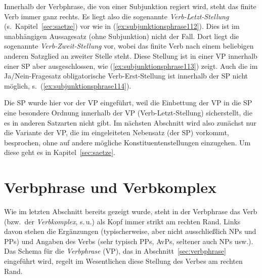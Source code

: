 
Innerhalb der Verbphrase, die von einer Subjunktion regiert wird, steht das finite Verb immer ganz rechts.
Es liegt also die sogenannte \textit{Verb-Letzt-Stellung} (s.\ Kapitel~\ref{sec:saetze}) vor wie in (\ref{ex:subjunktionsphrase112}).
Dies ist im unabhängigen Aussagesatz (ohne Subjunktion) nicht der Fall.
Dort liegt die sogenannte \textit{Verb-Zweit-Stellung} vor, wobei das finite Verb nach einem beliebigen anderen Satzglied an zweiter Stelle steht.
Diese Stellung ist in einer VP innerhalb einer SP aber ausgeschlossen, wie (\ref{ex:subjunktionsphrase113}) zeigt.
Auch die im Ja\slash Nein-Fragesatz obligatorische Verb-Erst-Stellung ist innerhalb der SP nicht möglich, s.\ (\ref{ex:subjunktionsphrase114}).


\begin{exe}
  \ex\label{ex:subjunktionsphrase111}
  \begin{xlist}
  \end{xlist}
\end{exe}


Die SP wurde hier vor der VP eingeführt, weil die Einbettung der VP in die SP eine besondere Ordnung innerhalb der VP (Verb-Letzt-Stellung) sicherstellt, die es in anderen Satzarten nicht gibt.
Im nächsten Abschnitt wird also zunächst nur die Variante der VP, die im eingeleiteten Nebensatz (der SP) vorkommt, besprochen, ohne auf andere mögliche Konstituentenstellungen einzugehen.
Um diese geht es in Kapitel~\ref{sec:saetze}.



\section{Verbphrase und Verbkomplex}
\label{sec:verbphraseundverbkomplex}

Wie im letzten Abschnitt bereits gezeigt wurde, steht in der Verbphrase das Verb (bzw.\ der \textit{Verbkomplex}, s.\,u.) als Kopf immer strikt am rechten Rand.
Links davon stehen die Ergänzungen (typischerweise, aber nicht ausschließlich NPs und PPs) und Angaben des Verbs (sehr typisch \zB PPs, AvPs, seltener auch NPs usw.).
Das Schema für die \textit{Verbphrase} (VP), das in Abschnitt~\ref{sec:verbphrase} eingeführt wird, regelt im Wesentlichen diese Stellung des Verbes am rechten Rand.

